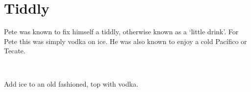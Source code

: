 \section[Tiddly]{Tiddly~}

\begin{recipestats}[
        servings=1,
        preptime=5~\minute,
        original=Pete Teresi,
    ]
\end{recipestats}

\begin{recipeabstract}
    Pete was known to fix himself a tiddly, otherwise known as a `little drink'.
    For Pete this was simply vodka on ice.
    He was also known to enjoy a cold Pac\'{i}fico or Tecate.
\end{recipeabstract}

\begin{ingredientcolumns}[1]
    \begin{ingredientblock}
        \\
    \end{ingredientblock}
\end{ingredientcolumns}

\begin{preparation}
\item Add ice to an old fashioned, top with vodka.
\end{preparation}

\recipeend%
